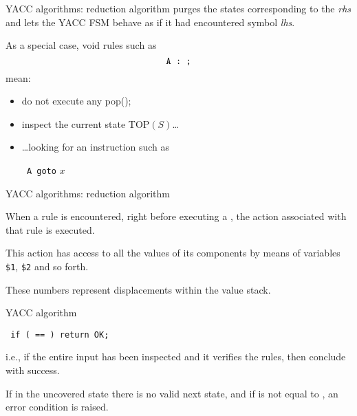 \begin{frame}[fragile]{YACC algorithms: reduction algorithm}
\reduce{} purges the states corresponding to the {\em rhs\/}
and lets the YACC FSM behave as if it had encountered
symbol {\em lhs}.


\vspace{20pt}

As a special case, void rules such as
$$\verb"A : ;"$$
mean: 


\vspace{20pt}

\begin{itemize}
\item do not execute any pop();
\item inspect the current state TOP$(S)$\ldots
\item \ldots looking for an instruction such as

\verb" A goto" $x$
\end{itemize}
\end{frame}

\begin{frame}[fragile]{YACC algorithms: reduction algorithm}

When a rule is encountered, right before executing a  \reduce{},
the action associated with that rule is executed.


\vspace{20pt}

This action has access to all the values of its components
by means of variables \verb"$1", \verb"$2" and so forth.


\vspace{20pt}

These numbers represent displacements within the value stack.
\end{frame}

\begin{frame}[fragile]{YACC algorithm}
\begin{center}\fbox{\accept}\end{center}
\begin{center}\tt
     if (\lat{} == \endmarker) return OK;
\end{center}


\vspace{20pt}

i.e., if the entire input has been inspected and it verifies
the rules, then conclude with success.

\begin{center}\fbox{\error}\end{center}
If in the uncovered state there is no valid next state,
and if  \lat{} is not equal to \endmarker, an error
condition is raised.
\end{frame}

